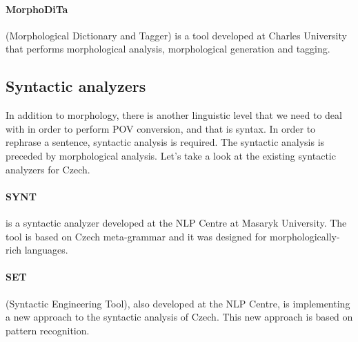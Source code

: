\paragraph{MorphoDiTa} (Morphological Dictionary and Tagger) is a tool developed at Charles University that performs morphological analysis, morphological generation and tagging. \cite{strakova14}

\subsection{Syntactic analyzers}

In addition to morphology, there is another linguistic level that we need to deal with in order to perform POV conversion, and that is syntax. In order to rephrase a sentence, syntactic analysis is required. The syntactic analysis is preceded by morphological analysis. Let's take a look at the existing syntactic analyzers for Czech.

\paragraph{SYNT} is a syntactic analyzer developed at the NLP Centre at Masaryk University. The tool is based on Czech meta-grammar and it was designed for morphologically-rich languages.

\paragraph{SET} (Syntactic Engineering Tool), also developed at the NLP Centre, is implementing a new approach to the syntactic analysis of Czech. This new approach is based on pattern recognition. \cite{set}

